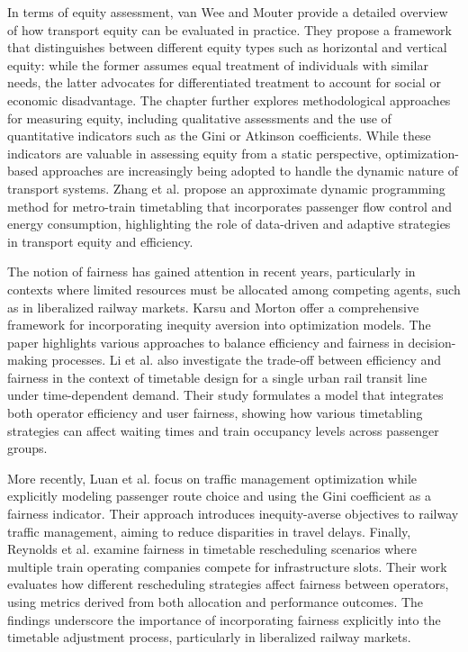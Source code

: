 \documentclass[preprint,12pt]{elsarticle}
\begin{document}
In terms of equity assessment, van Wee and Mouter \cite{Wee2021} provide a detailed overview of how transport equity can be evaluated in practice. They propose a framework that distinguishes between different equity types such as horizontal and vertical equity: while the former assumes equal treatment of individuals with similar needs, the latter advocates for differentiated treatment to account for social or economic disadvantage. The chapter further explores methodological approaches for measuring equity, including qualitative assessments and the use of quantitative indicators such as the Gini or Atkinson coefficients. While these indicators are valuable in assessing equity from a static perspective, optimization-based approaches are increasingly being adopted to handle the dynamic nature of transport systems. Zhang et al. \cite{Zhang2024} propose an approximate dynamic programming method for metro-train timetabling that incorporates passenger flow control and energy consumption, highlighting the role of data-driven and adaptive strategies in transport equity and efficiency.

The notion of fairness has gained attention in recent years, particularly in contexts where limited resources must be allocated among competing agents, such as in liberalized railway markets. Karsu and Morton \cite{Karsu2015} offer a comprehensive framework for incorporating inequity aversion into optimization models. The paper highlights various approaches to balance efficiency and fairness in decision-making processes. Li et al. \cite{Zhang2019} also investigate the trade-off between efficiency and fairness in the context of timetable design for a single urban rail transit line under time-dependent demand. Their study formulates a model that integrates both operator efficiency and user fairness, showing how various timetabling strategies can affect waiting times and train occupancy levels across passenger groups.

More recently, Luan et al. \cite{Luan2023} focus on traffic management optimization while explicitly modeling passenger route choice and using the Gini coefficient as a fairness indicator. Their approach introduces inequity-averse objectives to railway traffic management, aiming to reduce disparities in travel delays. Finally, Reynolds et al. \cite{Reynolds2023} examine fairness in timetable rescheduling scenarios where multiple train operating companies compete for infrastructure slots. Their work evaluates how different rescheduling strategies affect fairness between operators, using metrics derived from both allocation and performance outcomes. The findings underscore the importance of incorporating fairness explicitly into the timetable adjustment process, particularly in liberalized railway markets.
\end{document}
